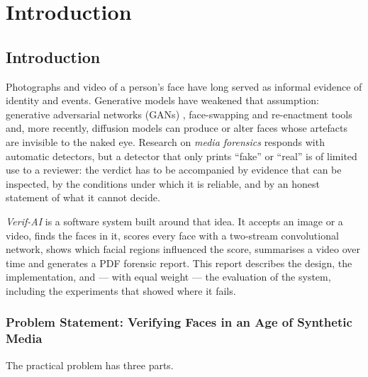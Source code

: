\chapter{Introduction}
\label{ch:intro}

\section{Introduction}
Photographs and video of a person's face have long served as informal evidence of identity and events. Generative models have weakened
that assumption: generative adversarial networks (GANs) \citep{goodfellow2014gan,karras2019stylegan}, face-swapping and re-enactment
tools \citep{rossler2019ff} and, more recently, diffusion models \citep{ho2020ddpm,rombach2022ldm} can produce or alter faces whose
artefacts are invisible to the naked eye. Research on \emph{media forensics} \citep{verdoliva2020media,tolosana2020deepfakes} responds
with automatic detectors, but a detector that only prints ``fake'' or ``real'' is of limited use to a reviewer: the verdict has to be accompanied
by evidence that can be inspected, by the conditions under which it is reliable, and by an honest statement of what it cannot decide.

\emph{Verif-AI} is a software system built around that idea. It accepts an image or a video, finds the faces in it, scores every face with a
two-stream convolutional network, shows which facial regions influenced the score, summarises a video over time and generates a PDF
forensic report. This report describes the design, the implementation, and --- with equal weight --- the evaluation of the system,
including the experiments that showed where it fails.

\subsection{Problem Statement: Verifying Faces in an Age of Synthetic Media}
The practical problem has three parts.

